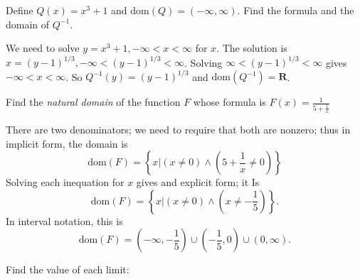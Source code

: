 \documentclass[12pt, answers,fleqn]{exam}
\newcommand{\reals}{\mathbf{R}}
\newcommand{\dom}{\mbox{dom}}
\begin{document}
\begin{questions}
\question   Define $Q(x) = x^3 + 1$ and $\dom(Q) = (-\infty,\infty)$. Find the formula
and the domain of $Q^{-1}$. 
\begin{solution} 
    We need to solve $y = x^3+1, -\infty < x < \infty $ for $x$. The
    solution is $x = (y-1)^{1/3}, -\infty < (y-1)^{1/3} < \infty $. 
    Solving $\infty < (y-1)^{1/3} < \infty$ gives $ -\infty < x < \infty$.
    So  $Q^{-1}(y) = (y-1)^{1/3}$ and $\dom(Q^{-1}) = \reals$.
\end{solution}
    \question   Find the \emph{natural domain} of the function $F$ whose
formula is $F(x) = \frac{1}{5+ \frac{1}{x}}$
\begin{solution}%
    There are two denominators; we need to require that both are nonzero; thus
    in implicit form, the domain is
    \[
        \dom(F) = \left \{ x | (x \neq 0) \land (5+ \frac{1}{x} \neq 0) \right \}
    \]
    Solving each inequation for $x$ gives and explicit form; it Is
    \[
        \dom(F) = \left \{ x | (x \neq 0) \land (x  \neq -\frac{1}{5}) \right \}.
    \]
    In interval notation, this is
    \[   \dom(F) = (-\infty, -\frac{1}{5}) \cup (-\frac{1}{5},0) \cup
          (0, \infty).
        \]
\end{solution}



\question Find the value of each limit:

\end{questions}
\end{document}
